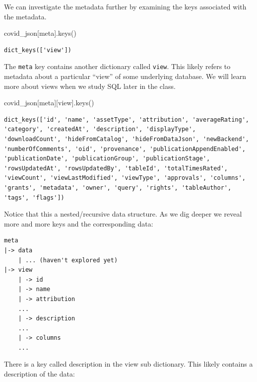 \documentclass[
  letterpaper,
  DIV=11,
  numbers=noendperiod]{scrreprt}
\newenvironment{Shaded}{\begin{snugshade}}{\end{snugshade}}
\newcommand{\NormalTok}[1]{\textcolor[rgb]{0.00,0.23,0.31}{#1}}
\newcommand{\StringTok}[1]{\textcolor[rgb]{0.13,0.47,0.30}{#1}}
\begin{document}
We can investigate the metadata further by examining the keys associated
with the metadata.

\begin{Shaded}
\begin{Highlighting}[]
\NormalTok{covid\_json[}\StringTok{\textquotesingle{}meta\textquotesingle{}}\NormalTok{].keys()}
\end{Highlighting}
\end{Shaded}

\begin{verbatim}
dict_keys(['view'])
\end{verbatim}

The \texttt{meta} key contains another dictionary called \texttt{view}.
This likely refers to metadata about a particular ``view'' of some
underlying database. We will learn more about views when we study SQL
later in the class.

\begin{Shaded}
\begin{Highlighting}[]
\NormalTok{covid\_json[}\StringTok{\textquotesingle{}meta\textquotesingle{}}\NormalTok{][}\StringTok{\textquotesingle{}view\textquotesingle{}}\NormalTok{].keys()}
\end{Highlighting}
\end{Shaded}

\begin{verbatim}
dict_keys(['id', 'name', 'assetType', 'attribution', 'averageRating', 'category', 'createdAt', 'description', 'displayType', 'downloadCount', 'hideFromCatalog', 'hideFromDataJson', 'newBackend', 'numberOfComments', 'oid', 'provenance', 'publicationAppendEnabled', 'publicationDate', 'publicationGroup', 'publicationStage', 'rowsUpdatedAt', 'rowsUpdatedBy', 'tableId', 'totalTimesRated', 'viewCount', 'viewLastModified', 'viewType', 'approvals', 'columns', 'grants', 'metadata', 'owner', 'query', 'rights', 'tableAuthor', 'tags', 'flags'])
\end{verbatim}

Notice that this a nested/recursive data structure. As we dig deeper we
reveal more and more keys and the corresponding data:

\begin{verbatim}
meta
|-> data
    | ... (haven't explored yet)
|-> view
    | -> id
    | -> name
    | -> attribution 
    ...
    | -> description
    ...
    | -> columns
    ...
\end{verbatim}

There is a key called description in the view sub dictionary. This
likely contains a description of the data:
\end{document}
